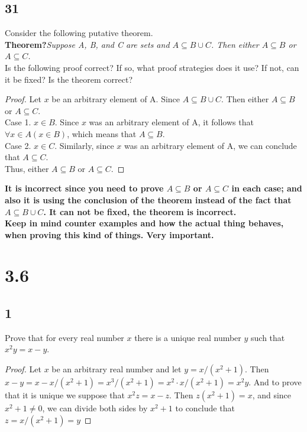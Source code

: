 \documentclass{article}
\begin{document}
\subsection{31}
Consider the following putative theorem.
$ $\\
\textbf{Theorem?}\textit{Suppose A, B, and C are sets and $A \subseteq B \cup C$. Then either $A \subseteq B$ or $A \subseteq C$.}
$ $ \\
Is the following proof correct? If so, what proof strategies does it use? If not, can it be fixed? Is the theorem correct?
\begin{proof}
Let $x$ be an arbitrary element of A. Since $A \subseteq B \cup C$. Then either $A \subseteq B$ or $A \subseteq C$. $ $\\
Case 1. $x \in B$. Since $x$ was an arbitrary element of A, it follows that $\forall x \in A (x \in B)$, which means that $A \subseteq B$. $ $\\
Case 2. $x \in C$. Similarly, since $x$ was an arbitrary element of A, we can conclude that $A \subseteq C$.
$ $\\
Thus, either $A \subseteq B$ or $A \subseteq C$.
\end{proof}
\textbf{It is incorrect since you need to prove $A \subseteq B$ or $A \subseteq C$ in each case; and also it is using the conclusion of the theorem instead of the fact that $A \subseteq B \cup C$. It can not be fixed, the theorem is incorrect.
$ $\\
Keep in mind counter examples and how the actual thing behaves, when proving this kind of things. Very important.}
\section{3.6}
\subsection{1}
Prove that for every real number $x$ there is a unique real number $y$ such that $x^2y=x-y$.
\begin{proof}
Let $x$ be an arbitrary real number and let $y=x/(x^2+1)$. Then $x-y=x - x/(x^2+1)= x^3/(x^2+1)=x^2 \cdot x/(x^2+1)=x^2y$. And to prove that it is unique we suppose that $x^2z=x-z$. Then $z(x^2+1)=x$, and since $x^2+1 \neq 0$, we can divide both sides by $x^2+1$ to conclude that $z = x/(x^2+1) = y$
\end{proof}
\end{document}
